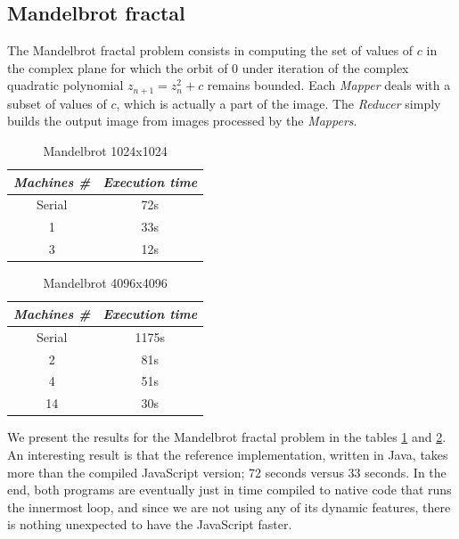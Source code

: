 \documentclass[letterpaper,twocolumn,10pt]{article}
\begin{document}
\subsection{Mandelbrot fractal}

The Mandelbrot fractal problem consists in computing the set of values of $c$ in
the complex plane for which the orbit of 0 under iteration of the complex
quadratic polynomial $z_{n+1} = z_{n}^2 + c$ remains bounded. Each
\textit{Mapper} deals with a subset of values of $c$, which is actually a part
of the image. The \textit{Reducer} simply builds the output image from images
processed by the \textit{Mappers}.

\begin{table}
\begin{center}
  \begin{tabular}{| c | c |}
    \hline
      \textit{Machines \#} & \textit{Execution time} \\
    \hline
      Serial & 72s \\
    \hline
      1 & 33s \\
    \hline
      3 & 12s \\
    \hline
  \end{tabular}
  \label{tab:mandelbrot1024}
  \caption{Mandelbrot 1024x1024}
\end{center}
\end{table}

\begin{table}
\begin{center}
  \begin{tabular}{| c | c |}
    \hline
      \textit{Machines \#} & \textit{Execution time} \\
    \hline
      Serial & 1175s \\
    \hline
      2 & 81s \\
    \hline
      4 & 51s \\
    \hline
      14 & 30s \\
    \hline
  \end{tabular}
  \label{tab:mandelbrot4096}
  \caption{Mandelbrot 4096x4096}
\end{center}
\end{table}

We present the results for the Mandelbrot fractal problem in the tables
\ref{tab:mandelbrot1024} and \ref{tab:mandelbrot4096}. An interesting result is
that the reference implementation, written in Java, takes more than the compiled
JavaScript version; 72 seconds versus 33 seconds. In the end, both programs are
eventually just in time compiled to native code that runs the innermost loop,
and since we are not using any of its dynamic features, there is nothing
unexpected to have the JavaScript faster.
\end{document}
